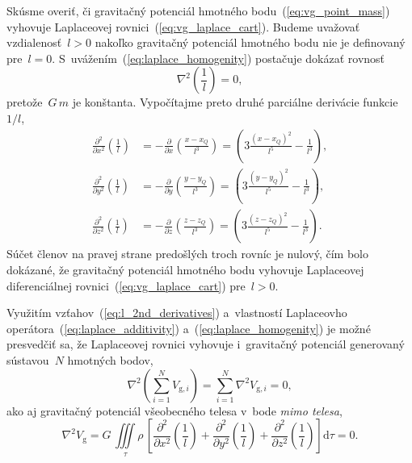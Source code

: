 \documentclass[a4paper,12pt]{book}
\newcommand{\diff}{\mathrm d}
\newcommand{\gidx}{\mathrm g}
\begin{document}
Skúsme overiť, či gravitačný potenciál hmotného bodu~(\ref{eq:vg_point_mass}) 
vyhovuje Laplaceovej rovnici~(\ref{eq:vg_laplace_cart}).  Budeme uvažovať 
vzdialenosť~$l > 0$ nakoľko gravitačný potenciál hmotného bodu nie je 
definovaný pre~$l = 0$.  S~uvážením~(\ref{eq:laplace_homogenity}) postačuje 
dokázať rovnosť
%
\begin{equation}
\label{eq:nabla_l}
\nabla^2 \left( \frac{1}{l} \right) = 0{,}
\end{equation}
%
pretože~$G \, m$ je konštanta.  Vypočítajme preto druhé parciálne
derivácie funkcie~$1 \slash l$,
%
\begin{equation}
\label{eq:l_2nd_derivatives}
\begin{split}
\frac{\partial^2}{\partial x^2} \left( \frac{1}{l} \right) &=
-\frac{\partial}{\partial x} \left( \frac{x - x_Q}{l^3} \right) = \left(3
\frac{(x - x_Q)^2}{l^5} - \frac{1}{l^3} \right){,}\\
%
\frac{\partial^2}{\partial y^2} \left( \frac{1}{l} \right) &=
-\frac{\partial}{\partial y} \left( \frac{y - y_Q}{l^3} \right) = \left(3
\frac{(y - y_Q)^2}{l^5} - \frac{1}{l^3} \right){,}\\
%
\frac{\partial^2}{\partial z^2} \left( \frac{1}{l} \right) &=
-\frac{\partial}{\partial z} \left( \frac{z - z_Q}{l^3} \right) = \left(3
\frac{(z - z_Q)^2}{l^5} - \frac{1}{l^3} \right){.}
\end{split}
\end{equation}
%
Súčet členov na pravej strane predošlých troch rovníc je nulový, čím bolo
dokázané, že gravitačný potenciál hmotného bodu vyhovuje Laplaceovej
diferenciálnej rovnici~(\ref{eq:vg_laplace_cart}) pre~$l > 0$.

Využitím vzťahov~(\ref{eq:l_2nd_derivatives}) a~vlastností Laplaceovho
operátora~(\ref{eq:laplace_additivity}) a~(\ref{eq:laplace_homogenity}) je
možné presvedčiť sa, že Laplaceovej rovnici vyhovuje i~gravitačný potenciál
generovaný sústavou~$N$ hmotných bodov,
%
\begin{equation}
\nabla^2 \left( \sum_{i = 1}^N V_{\gidx,i} \right) = \sum_{i = 1}^N \nabla^2
V_{\gidx,i} = 0{,}
\end{equation}
%
ako aj gravitačný potenciál všeobecného telesa v~bode \emph{mimo telesa},
%
\begin{equation}
\nabla^2 V_\gidx = G\, \iiint\limits_\tau \rho \, \left[ 
\frac{\partial^2}{\partial
x^2}\left(\frac{1}{l}\right) + \frac{\partial^2}{\partial
y^2}\left(\frac{1}{l}\right) + \frac{\partial^2}{\partial
z^2}\left(\frac{1}{l}\right) \right] \diff\tau = 0{.}
\end{equation}
\end{document}
